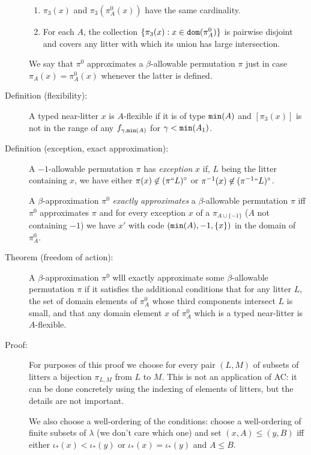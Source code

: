 \documentclass[112pt]{article}
\begin{document}
\begin{description}
\begin{enumerate}
\item $\pi_3(x)$ and $\pi_3(\pi^0_A(x))$ have the same cardinality.  

\item  For each $A$, the collection $\{\pi_3(x): x \in {\tt dom}(\pi^0_A)\}$ is pairwise disjoint  and covers any litter with which its union has large intersection.

\end{enumerate}

We say that $\pi^0$ approximates a $\beta$-allowable permutation $\pi$ just in case $\pi_A(x) = \pi^0_A(x)$ whenever the latter is defined.

\item[Definition (flexibility):]  A typed near-litter $x$ is $A$-flexible if it is of type ${\tt min}(A)$ and $[\pi_3(x)]$ is not in the range of any $f_{\gamma,{\tt min}(A)}$
for $\gamma<{\tt min}(A_1)$.

\item[Definition (exception, exact approximation):]  A $-1$-allowable permutation $\pi$ has {\em exception\/} $x$ if, $L$ being the litter containing $x$,
we have either $\pi(x) \not\in (\pi``L)^\circ$ or $\pi^{-1}(x) \not\in (\pi^{-1}``L)^\circ$.

A $\beta$-approximation $\pi^0$ {\em exactly approximates\/} a $\beta$-allowable permutation $\pi$ iff $\pi^0$ approximates $\pi$ and
for every exception $x$ of a $\pi_{A \cup \{-1\}}$ ($A$ not containing $-1$) we have $x'$ with code $({\tt min}(A),-1,\{x\})$ in the domain of
$\pi^0_A$.

\item[Theorem (freedom of action):]  A $\beta$-approximation $\pi^0$ wlll exactly approximate some $\beta$-allowable permutation $\pi$ if it satisfies the additional conditions that for any litter $L$, the set of domain elements of $\pi^0_A$ whose third components intersect $L$ is small,
and that any domain element $x$ of $\pi^0_A$ which is a typed near-litter is $A$-flexible.

\item[Proof:]  For purposes of this proof we choose for every pair $(L,M)$ of subsets of litters a bijection $\pi_{L,M}$ from $L$ to $M$.  This is not an application of AC:  it can be done concretely using the indexing of elements of litters, but the details are not important.

We also choose a well-ordering of the conditions:  choose a well-ordering of finite subsets of $\lambda$ (we don't care which one) and
set $(x,A) \leq (y,B)$ iff either $\iota_*(x) < \iota_*(y)$ or $\iota_*(x) = \iota_*(y)$ and $A \leq B$.


\end{description}
\end{document}
